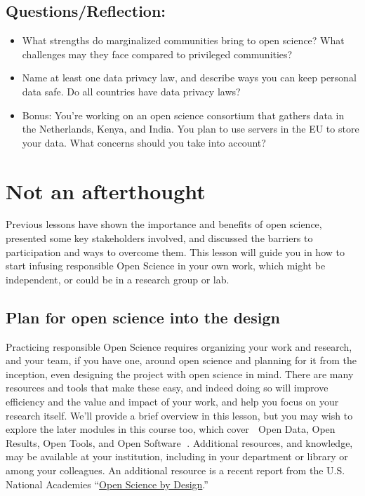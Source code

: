 \documentclass[
  letterpaper,
  DIV=11,
  numbers=noendperiod]{scrreport}
\providecommand{\tightlist}{%
  \setlength{\itemsep}{0pt}\setlength{\parskip}{0pt}}\usepackage{longtable,booktabs,array}
\begin{document}
\hypertarget{questionsreflection-3}{%
\section{Questions/Reflection:}\label{questionsreflection-3}}

\begin{itemize}
\tightlist
\item
  What strengths do marginalized communities bring to open science? What
  challenges may they face compared to privileged communities?
\item
  Name at least one data privacy law, and describe ways you can keep
  personal data safe. Do all countries have data privacy laws?
\item
  Bonus: You're working on an open science consortium that gathers data
  in the Netherlands, Kenya, and India. You plan to use servers in the
  EU to store your data. What concerns should you take into account?
\end{itemize}

\hypertarget{not-an-afterthought}{%
\chapter{Not an afterthought}\label{not-an-afterthought}}

Previous lessons have shown the importance and benefits of open science,
presented some key stakeholders involved, and discussed the barriers to
participation and ways to overcome them. This lesson will guide you in
how to start infusing responsible Open Science in your own work, which
might be independent, or could be in a research group or lab.

\hypertarget{plan-for-open-science-into-the-design}{%
\section{Plan for open science into the
design}\label{plan-for-open-science-into-the-design}}

Practicing responsible Open Science requires organizing your work and
research, and your team, if you have one, around open science and
planning for it from the inception, even designing the project with open
science in mind. There are many resources and tools that make these
easy, and indeed doing so will improve efficiency and the value and
impact of your work, and help you focus on your research itself. We'll
provide a brief overview in this lesson, but you may wish to explore the
later modules in this course too, which cover 🔗 Open Data, Open
Results, Open Tools, and Open Software 🔗. Additional resources, and
knowledge, may be available at your institution, including in your
department or library or among your colleagues. An additional resource
is a recent report from the U.S. National Academies
``\href{https://nap.nationalacademies.org/catalog/25116/open-science-by-design-realizing-a-vision-for-21st-century}{Open
Science by Design}.''
\end{document}
